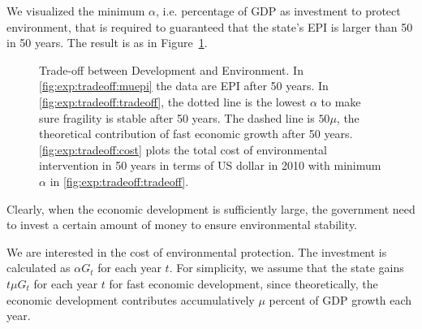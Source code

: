 We visualized the minimum $\alpha$, i.e. percentage of GDP as investment to protect environment, that is required to guaranteed that the state's EPI is larger than 50 in 50 years. The result is as in Figure~\ref{fig:exp:tradeoff}.
\begin{figure}[htbp]
   \centering
   \caption{Trade-off between Development and Environment. In \ref{fig:exp:tradeoff:muepi} the data are EPI after 50 years. In \ref{fig:exp:tradeoff:tradeoff}, the dotted line is the lowest $\alpha$ to make sure fragility is stable after 50 years. The dashed line is $50\mu$, the theoretical contribution of fast economic growth after 50 years. \ref{fig:exp:tradeoff:cost} plots the total cost of environmental intervention in 50 years in terms of US dollar in 2010 with minimum $\alpha$ in \ref{fig:exp:tradeoff:tradeoff}.}
   \label{fig:exp:tradeoff}
\end{figure}

Clearly, when the economic development is sufficiently large, the government need to invest a certain amount of money to ensure environmental stability.

We are interested in the cost of environmental protection. The investment is calculated as $\alpha G_t$ for each year $t$. For simplicity, we assume that the state gains $t\mu G_t$ for each year $t$ for fast economic development, since theoretically, the economic development contributes accumulatively $\mu$ percent of GDP growth each year. 

